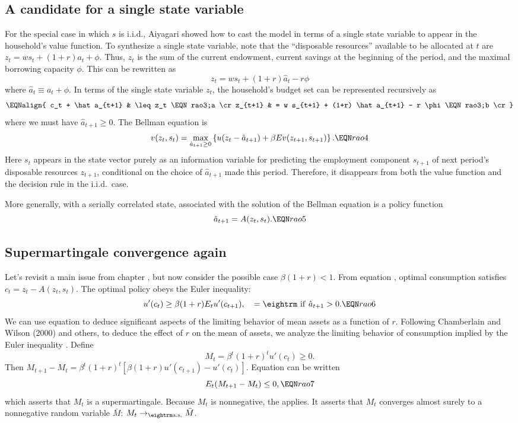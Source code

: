 \subsection{A candidate for a single state variable}
For the special case in which $s$ is i.i.d., Aiyagari
showed how to cast the model in terms of a single state
variable to appear in the household's value function.
To synthesize a single state  variable, note that
the ``disposable resources'' available to be allocated at  $t$
are
$ z_t = w s_t + (1+r) a_t + \phi$.
 Thus, $z_t$ is the sum of
the current endowment, current savings at the beginning of the
period, and the maximal borrowing capacity
$\phi$.  This can be rewritten as
$$z_t = w s_t + (1+r) \hat a_t - r \phi$$
where  $\hat a_t \equiv a_t +\phi$.
In terms of the single state variable $z_t$,
the household's budget set can   be represented recursively as
$$\EQNalign{ c_t + \hat a_{t+1} &  \leq z_t   \EQN rao3;a \cr
            z_{t+1} & = w s_{t+1} + (1+r) \hat a_{t+1}  - r \phi
         \EQN rao3;b \cr}$$
where we must have $\hat a_{t+1} \geq 0$.
The Bellman equation is
$$ v(z_t,s_t) = \max_{\hat a_{t+1} \geq 0} \left\{u(z_t - \hat a_{t+1})
    + \beta E v(z_{t+1}, s_{t+1})  \right\}. \EQN rao4 $$
Here $s_t$ appears in the state vector purely as an
information variable for predicting the
employment component
$s_{t+1}$ of next period's disposable resources $z_{t+1}$,
conditional on the choice of $\hat a_{t+1}$ made this period.
Therefore, it disappears from both the value function and the decision
rule in the i.i.d.\ case.

More generally, with a serially correlated state,
associated with the solution of the Bellman
equation is a policy function
$$ \hat a_{t+1} = A(z_t, s_t). \EQN rao5$$

\subsection{Supermartingale convergence again}
Let's revisit a main issue from chapter , but now
consider the possible case $\beta (1+r) < 1$.
From equation , optimal consumption satisfies
$c_t = z_t - A(z_t,s_t)$.
The optimal policy obeys the Euler inequality:
$$ u'(c_t) \geq \beta (1+r) E_t u'(c_{t+1}), \quad = {\rm \ if \ }
     \hat a_{t+1} > 0.  \EQN rao6  $$
We can use equation  to deduce significant aspects of the
limiting behavior of mean assets as a function of $r$.
 Following Chamberlain and Wilson (2000) and others,
  to deduce the effect of $r$ on the mean of assets, we analyze
the limiting behavior of consumption implied by the Euler inequality
.
Define
 $$M_t = \beta^t (1+r)^t u'(c_t) \geq 0. $$
Then
$ M_{t+1} - M_t= \beta^t(1+r)^t[\beta (1+r) u'(c_{t+1}) - u'(c_t)]$.
Equation   can be written
$$ E_t (M_{t+1} - M_t) \leq 0, \EQN rao7 $$
which asserts that $M_t$ is a supermartingale.  Because
$M_t$ is  nonnegative, the 
applies.  It
asserts that $M_t$ converges almost surely to a nonnegative
random variable $\bar M$: $M_t \rightarrow_{\rm a.s.} \bar M$.

